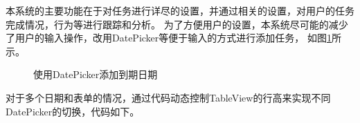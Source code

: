本系统的主要功能在于对任务进行详尽的设置，并通过相关的设置，对用户的任务完成情况，行为等进行跟踪和分析。
为了方便用户的设置，本系统尽可能的减少了用户的输入操作，改用DatePicker等便于输入的方式进行添加任务\parencite{app2019swift}，
如图\ref{fig:add_task_duedate}所示。

\begin{figure}[H]
	\centering
	\caption{使用DatePicker添加到期日期}
	\label{fig:add_task_duedate}
\end{figure}

对于多个日期和表单的情况，通过代码动态控制TableView的行高来实现不同DatePicker的切换，代码如下。

